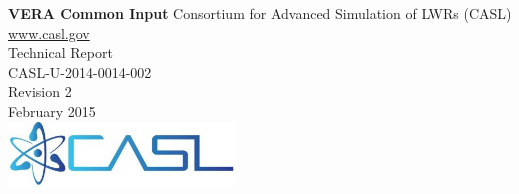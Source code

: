 %
%
%

\begin{titlepage}
    \centering
    \vfill
    {\bfseries\LARGE
        VERA Common Input}
        \vskip4cm
    {\Large
        Consortium for Advanced Simulation of LWRs (CASL) \\
        \href{http://www.casl.gov}{www.casl.gov} \\
        \vskip1cm
        Technical Report \\
        CASL-U-2014-0014-002  \\
        \vskip1cm
        Revision 2 \\
        February 2015 \\
    }
    \vfill
    \vfill
    \includegraphics[width=6cm]{figs/casl_sm.jpg}
    \vfill
\end{titlepage}
